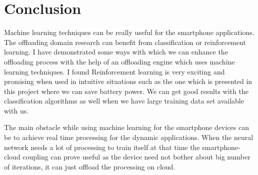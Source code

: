 \documentclass{article}
\begin{document}
\section{Conclusion}
Machine learning techniques can be really useful for the smartphone applications. The offloading domain research can benefit from classification or reinforcement learning. I have demonstrated some ways with which we can enhance the offloading process with the help
of an offloading engine which uses machine learning techniques. I found Reinforcement learning is very exciting and promising when used in intuitive situations such as the one which is presented in this project where we can save battery power. We can get good results with the classification algorithms as well when we have large training data set available with us. \par
The main obstacle while using machine learning for the smartphone devices can be to achieve real time processing for the dynamic applications. When the neural network needs a lot of processing to train itself at that time the smartphone-cloud coupling can prove useful as the device need not bother about big number of iterations, it can just offload the processing on cloud. 



\end{document}
